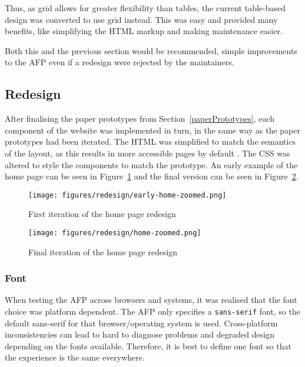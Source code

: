 \documentclass[bsc,frontabs,oneside,singlespacing,parskip,deptreport,logo]{infthesis}
\begin{document}
Thus, as grid allows for greater flexibility than tables, the current table-based design was converted to use grid instead. This was easy and provided many benefits, like simplifying the HTML markup and making maintenance easier.

Both this and the previous section would be recommended, simple improvements to the AFP even if a redesign were rejected by the maintainers.

\subsection{Redesign}

After finalising the paper prototypes from Section~\ref{paperPrototypes}, each component of the website was implemented in turn, in the same way as the paper prototypes had been iterated. The HTML was simplified to match the semantics of the layout, as this results in more accessible pages by default \cite{mdn_contributors_html_2021}. The CSS was altered to style the components to match the prototype. An early example of the home page can be seen in Figure~\ref{home-early} and the final version can be seen in Figure~\ref{home-final}.

\begin{figure}[h]
    \centering
    \texttt{[image: figures/redesign/early-home-zoomed.png]}
    \caption{First iteration of the home page redesign}
    \label{home-early}
\end{figure}

\begin{figure}[h]
    \centering
    \texttt{[image: figures/redesign/home-zoomed.png]}
    \caption{Final iteration of the home page redesign}
    \label{home-final}
\end{figure}

\subsubsection{Font}

When testing the AFP across browsers and systems, it was realised that the font choice was platform dependent. The AFP only specifies a \verb|sans-serif| font, so the default sans-serif for that browser/operating system is used. Cross-platform inconsistencies can lead to hard to diagnose problems and degraded design depending on the fonts available. Therefore, it is best to define one font so that the experience is the same everywhere. 
\end{document}
